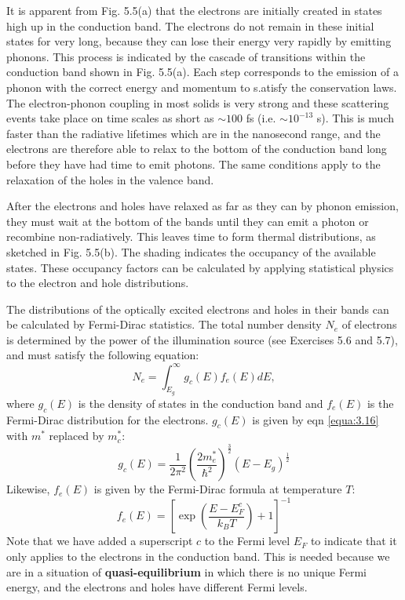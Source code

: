 \documentclass[12pt]{book}
\begin{document}
It is apparent from Fig. 5.5(a) that the electrons are initially created in states high up in the conduction band. The electrons do not remain in these initial states for very long, because they can lose their energy very rapidly by emitting phonons. This process is indicated by the cascade of transitions within the conduction band shown in Fig. 5.5(a). Each step corresponds to the emission of a phonon with the correct energy and momentum to s.atisfy the conservation laws. The electron-phonon coupling in most solids is very strong and these scattering events take place on time scales as short as $\sim 100$ fs (i.e. $\sim 10^{-13}$ s). This is much faster than the radiative lifetimes which are in the nanosecond range, and the electrons are therefore able to relax to the bottom of the conduction band long before they have had time to emit photons. The same conditions apply to the relaxation of the holes in the valence band.

After the electrons and holes have relaxed as far as they can by phonon emission, they must wait at the bottom of the bands until they can emit a photon or recombine non-radiatively. This leaves time to form thermal distributions, as sketched in Fig. 5.5(b). The shading indicates the occupancy of the available states. These occupancy factors can be calculated by applying statistical physics to the electron and hole distributions.

The distributions of the optically excited electrons and holes in their bands can be calculated by Fermi-Dirac statistics. The total number density $N_e$ of electrons is determined by the power of the illumination source (see Exercises 5.6 and 5.7), and must satisfy the following equation:
\begin{equation}\label{equa:5.6}
  N_e=\int_{E_g}^{\infty}g_c(E)f_e(E)dE,
\end{equation}
where $g_c(E)$ is the density of states in the conduction band and $f_e(E)$ is the Fermi-Dirac distribution for the electrons. $g_c(E)$ is given by eqn \ref{equa:3.16} with $m^*$ replaced by $m_c^*$:
\begin{equation}\label{equa:5.7}
  g_c(E)=\frac{1}{2\pi^2}(\frac{2m_e^*}{\hbar^2})^{\frac{3}{2}}(E-E_g)^{\frac{1}{2}}
\end{equation}
Likewise, $f_e(E)$ is given by the Fermi-Dirac formula at temperature $T$:
\begin{equation}\label{equa:5.8}
  f_e(E)=[\exp(\frac{E-E_F^c}{k_BT})+1]^{-1}
\end{equation}
Note that we have added a superscript $c$ to the Fermi level $E_F$ to indicate that it only applies to the electrons in the conduction band. This is needed because we are in a situation of \textbf{quasi-equilibrium} in which there is no unique Fermi energy, and the electrons and holes have different Fermi levels.
\end{document}
